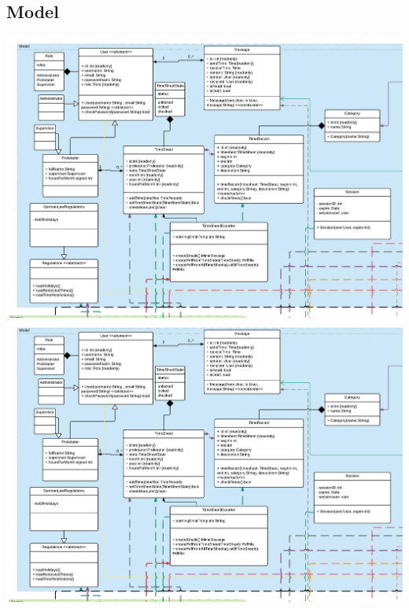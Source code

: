     \subsection{Model}
        \includegraphics[width=\linewidth,page=1]{Diagramms/class/model.pdf}\\
        \includegraphics[width=\linewidth,page=2]{Diagramms/class/model.pdf}\\
